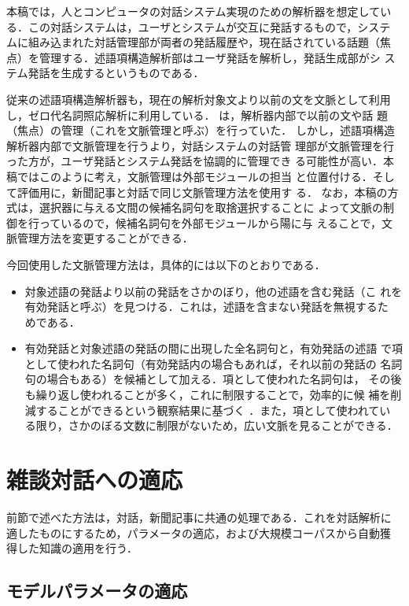 \documentclass[japanese]{jnlp_1.4}
\begin{document}
本稿では，人とコンピュータの対話システム実現のための解析器を想定してい
る．この対話システムは，ユーザとシステムが交互に発話するもので，システ
ムに組み込まれた対話管理部が両者の発話履歴や，現在話されている話題（焦
点）を管理する．述語項構造解析部はユーザ発話を解析し，発話生成部がシ
ステム発話を生成するというものである．

従来の述語項構造解析器も，現在の解析対象文より以前の文を文脈として利用
し，ゼロ代名詞照応解析に利用している．
は，解析器内部で以前の文や話
題（焦点）の管理（これを文脈管理と呼ぶ）を行っていた．
しかし，述語項構造解析器内部で文脈管理を行うより，対話システムの対話管
理部が文脈管理を行った方が，ユーザ発話とシステム発話を協調的に管理でき
る可能性が高い．本稿ではこのように考え，文脈管理は外部モジュールの担当
と位置付ける．そして評価用に，新聞記事と対話で同じ文脈管理方法を使用す
る．
なお，本稿の方式は，選択器に与える文間の候補名詞句を取捨選択することに
よって文脈の制御を行っているので，候補名詞句を外部モジュールから陽に与
えることで，文脈管理方法を変更することができる．

今回使用した文脈管理方法は，具体的には以下のとおりである．

\begin{itemize}
\item 対象述語の発話より以前の発話をさかのぼり，他の述語を含む発話（こ
れを有効発話と呼ぶ）を見つける．これは，述語を含まない発話を無視するた
めである．
\item 有効発話と対象述語の発話の間に出現した全名詞句と，有効発話の述語
で項として使われた名詞句（有効発話内の場合もあれば，それ以前の発話の
名詞句の場合もある）を候補として加える．項として使われた名詞句は，
その後も繰り返し使われることが多く，これに制限することで，効率的に候
補を削減することができるという観察結果に基づく
\cite{imamura-saito-izumi:2009:Short}．また，項として使われてい
る限り，さかのぼる文数に制限がないため，広い文脈を見ることができる．
\end{itemize}


\section{雑談対話への適応}
\label{sec-adaptation}

前節で述べた方法は，対話，新聞記事に共通の処理である．これを対話解析に
適したものにするため，パラメータの適応，および大規模コーパスから自動獲
得した知識の適用を行う．

\subsection{モデルパラメータの適応}
\end{document}

